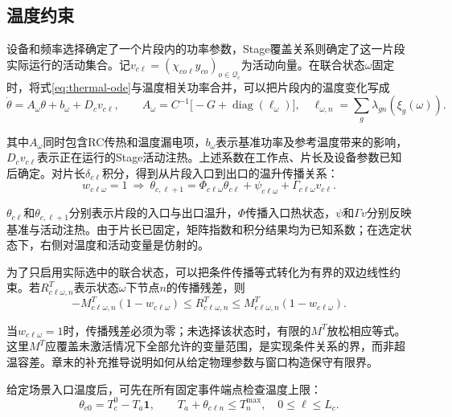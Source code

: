 \subsection{温度约束}

设备和频率选择确定了一个片段内的功率参数，Stage覆盖关系则确定了这一片段实际运行的活动集合。记$v_{c\ell}=(\chi_{co\ell}y_{co})_{o\in\mathcal Q_c}$为活动向量。在联合状态$\omega$固定时，将式\eqref{eq:thermal-ode}与温度相关功率合并，可以把片段内的温度变化写成
\begin{equation}
\dot\theta=A_\omega\theta+b_\omega+D_cv_{c\ell},\qquad
A_\omega=C^{-1}\bigl[-G+\operatorname{diag}(\ell_\omega)\bigr],
\quad \ell_{\omega,n}=\sum_g\lambda_{gn}(\xi_g(\omega)).
\label{eq:state-ode}
\end{equation}

其中$A_\omega$同时包含RC传热和温度漏电项，$b_\omega$表示基准功率及参考温度带来的影响，$D_cv_{c\ell}$表示正在运行的Stage活动注热。上述系数在工作点、片长及设备参数已知后确定。对片长$\delta_{c\ell}$积分，得到从片段入口到出口的温升传播关系：
\begin{equation}
w_{c\ell\omega}=1\ \Longrightarrow\
\theta_{c,\ell+1}=\Phi_{c\ell\omega}\theta_{c\ell}
+\psi_{c\ell\omega}+\Gamma_{c\ell\omega}v_{c\ell}.
\label{eq:thermal-transition}
\end{equation}

$\theta_{c\ell}$和$\theta_{c,\ell+1}$分别表示片段的入口与出口温升，$\Phi$传播入口热状态，$\psi$和$\Gamma v$分别反映基准与活动注热。由于片长已固定，矩阵指数和积分结果均为已知系数；在选定状态下，右侧对温度和活动变量是仿射的。

为了只启用实际选中的联合状态，可以把条件传播等式转化为有界的双边线性约束。若$R^T_{c\ell\omega,n}$表示状态$\omega$下节点$n$的传播残差，则
\begin{equation}
-M^T_{c\ell\omega,n}(1-w_{c\ell\omega})
\le R^T_{c\ell\omega,n}
\le M^T_{c\ell\omega,n}(1-w_{c\ell\omega}).
\label{eq:thermal-bigM}
\end{equation}

当$w_{c\ell\omega}=1$时，传播残差必须为零；未选择该状态时，有限的$M^T$放松相应等式。这里$M^T$应覆盖未激活情况下全部允许的变量范围，是实现条件关系的界，而非超温容差。章末的补充推导说明如何从给定物理参数与窗口构造保守有限界。

给定场景入口温度后，可先在所有固定事件端点检查温度上限：
\begin{equation}
\theta_{c0}=T_c^0-T_a\mathbf1,\qquad
T_a+\theta_{c\ell n}\le T_n^{\max},\quad 0\le\ell\le L_c.
\label{eq:event-temperature}
\end{equation}

